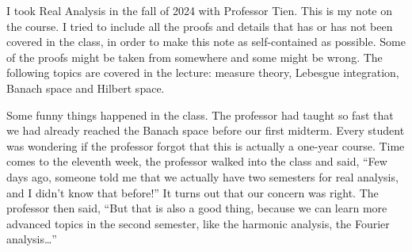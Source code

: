 I took Real Analysis in the fall of 2024 with Professor Tien. This is my 
note on the course. I tried to include all the proofs and details that has 
or has not been covered in the class, in order to make this note as 
self-contained as possible. Some of the proofs might be taken from 
somewhere and some might be wrong. The following topics are covered in 
the lecture: measure theory, Lebesgue integration, Banach space and 
Hilbert space.

Some funny things happened in the class. The professor had taught so 
fast that we had already reached the Banach space before our first 
midterm. Every student was wondering if the professor forgot that this 
is actually a one-year course. Time comes to the eleventh week, the 
professor walked into the class and said, ``Few days ago, someone told 
me that we actually have two semesters for real analysis, and I didn't 
know that before!'' It turns out that our concern was right. The professor 
then said, ``But that is also a good thing, because we can learn more 
advanced topics in the second semester, like the harmonic analysis, 
the Fourier analysis\ldots'' 